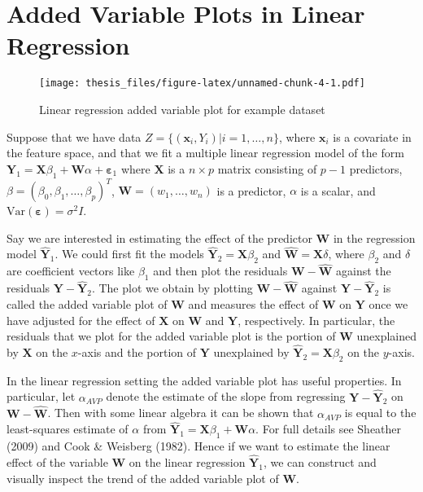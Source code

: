 \documentclass[12pt,twoside]{reedthesis}
\theoremstyle{definition}
\theoremstyle{definition}
\theoremstyle{definition}
\theoremstyle{remark}
\begin{document}
\section{Added Variable Plots in Linear
Regression}\label{added-variable-plots-in-linear-regression}
\begin{figure}
\centering
\texttt{[image: thesis\_files/figure-latex/unnamed-chunk-4-1.pdf]}
\caption{\label{fig:unnamed-chunk-4}\label{AVPlinex}Linear regression added
variable plot for example dataset}
\end{figure}
Suppose that we have data \(Z=\{(\mathbf{x}_i,Y_i)|i=1,\ldots,n\}\),
where \(\mathbf{x}_i\) is a covariate in the feature space, and that we
fit a multiple linear regression model of the form
\(\mathbf{Y}_1=\mathbf{X}\beta_1+\mathbf{W}\alpha+\mathbf{\varepsilon}_1\)
where \(\mathbf{X}\) is a \(n\times p\) matrix consisting of \(p-1\)
predictors, \(\beta=(\beta_0,\beta_1,\ldots,\beta_p)^T\),
\(\mathbf{W}=(w_1,\ldots,w_n)\) is a predictor, \(\alpha\) is a scalar,
and \(\text{Var}(\mathbf{\varepsilon})=\sigma^2 I\). \par

Say we are interested in estimating the effect of the predictor
\(\mathbf{W}\) in the regression model \(\hat{\mathbf{Y}}_1\). We could
first fit the models \(\hat{\mathbf{Y}}_2=\mathbf{X}\beta_2\) and
\(\hat{\mathbf{W}}=\mathbf{X}\delta\), where \(\beta_2\) and \(\delta\)
are coefficient vectors like \(\beta_1\) and then plot the residuals
\(\mathbf{W}-\hat{\mathbf{W}}\) against the residuals
\(\mathbf{Y}-\hat{\mathbf{Y}}_2\). The plot we obtain by plotting
\(\mathbf{W}-\hat{\mathbf{W}}\) against
\(\mathbf{Y}-\hat{\mathbf{Y}}_2\) is called the added variable plot of
\(\mathbf{W}\) and measures the effect of \(\mathbf{W}\) on
\(\mathbf{Y}\) once we have adjusted for the effect of \(\mathbf{X}\) on
\(\mathbf{W}\) and \(\mathbf{Y}\), respectively. In particular, the
residuals that we plot for the added variable plot is the portion of
\(\mathbf{W}\) unexplained by \(\mathbf{X}\) on the \(x\)-axis and the
portion of \(\mathbf{Y}\) unexplained by
\(\hat{\mathbf{Y}}_2=\mathbf{X}\beta_2\) on the \(y\)-axis. \par

In the linear regression setting the added variable plot has useful
properties. In particular, let \(\alpha_{AVP}\) denote the estimate of
the slope from regressing \(\mathbf{Y}-\hat{\mathbf{Y}}_2\) on
\(\mathbf{W}-\hat{\mathbf{W}}\). Then with some linear algebra it can be
shown that \(\alpha_{AVP}\) is equal to the least-squares estimate of
\(\alpha\) from
\(\hat{\mathbf{Y}}_1=\mathbf{X}\beta_1+\mathbf{W}\alpha\). For full
details see Sheather (2009) and Cook \& Weisberg (1982). Hence if we
want to estimate the linear effect of the variable \(\mathbf{W}\) on the
linear regression \(\hat{\mathbf{Y}}_1\), we can construct and visually
inspect the trend of the added variable plot of \(\mathbf{W}\). \par
\end{document}
